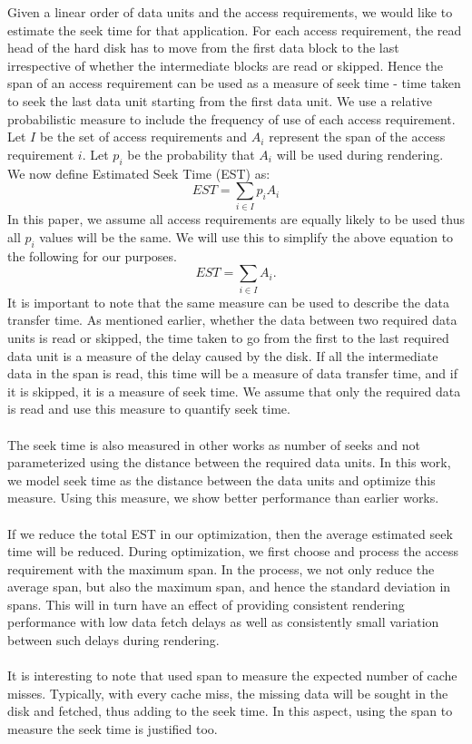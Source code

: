 Given a linear order of data units and the access requirements, we would like to
estimate the seek time for that application.  For each access requirement, the
read head of the hard disk has to move from the first data block to the last
irrespective of whether the intermediate blocks are read or skipped. Hence the
span of an access requirement can be used as a measure of seek time - time
taken to seek the last data unit starting from the first data unit. We use a relative probabilistic measure to include the frequency of use of each access requirement.  Let $I$ be
the set of access requirements and $A_i$ represent the span of the access
requirement $i$. Let $p_i$ be the probability that $A_i$ will be used during rendering. We now define Estimated Seek Time (EST) as:
\begin{equation}
EST = \sum_{i\in I}p_i A_i
\end{equation}
In this paper, we assume all access requirements are equally likely to be used thus all $p_i$ values will be the same. We will use this to simplify the above equation to the following for our purposes.
\[
EST = \sum_{i \in I}{A_i}.
\]
It is important to note that the same measure can be used to describe the data transfer time. As mentioned earlier, whether the data between two required data units is read or skipped, the time taken to go from the first to the last required data unit is a measure of the delay caused by the disk. If all the intermediate data in the span is read, this time will be a measure of data transfer time, and if it is skipped, it is a measure of seek time. We assume that only the required data is read and use this measure to quantify seek time.  \\
\\
The seek time is also measured in other works \cite{optimizingredundancy,singleseeklayout} as number of seeks and not parameterized using the distance between the required data units. In this work, we model seek time as the distance between the data units and optimize this measure. Using this measure, we show better performance than earlier works.\\
\\
If we reduce the total EST in our optimization, then the average estimated seek time will be reduced. During optimization, we first  choose and process the access requirement with the maximum span. In the process, we not only reduce the average span, but also the maximum span, and hence the standard deviation in spans. This will in turn have an effect of providing consistent rendering performance with low data fetch delays as well as consistently small variation between such delays during rendering. \\
\\
It is interesting to note that \cite{cacheobliviouslayout}
used span to measure the expected number of cache misses.  Typically, with
every cache miss, the missing data will be sought in the disk and fetched, thus
adding to the seek time. In this aspect, using the span to measure the seek time is
justified too.


